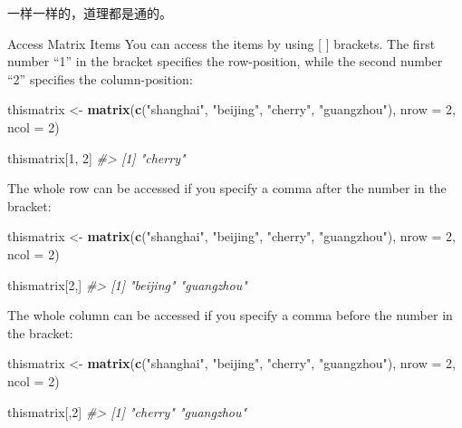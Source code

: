 \documentclass[
]{book}
\newenvironment{Shaded}{\begin{snugshade}}{\end{snugshade}}
\newcommand{\AttributeTok}[1]{\textcolor[rgb]{0.13,0.29,0.53}{#1}}
\newcommand{\CommentTok}[1]{\textcolor[rgb]{0.56,0.35,0.01}{\textit{#1}}}
\newcommand{\DecValTok}[1]{\textcolor[rgb]{0.00,0.00,0.81}{#1}}
\newcommand{\FunctionTok}[1]{\textcolor[rgb]{0.13,0.29,0.53}{\textbf{#1}}}
\newcommand{\NormalTok}[1]{#1}
\newcommand{\OtherTok}[1]{\textcolor[rgb]{0.56,0.35,0.01}{#1}}
\newcommand{\StringTok}[1]{\textcolor[rgb]{0.31,0.60,0.02}{#1}}
\begin{document}
一样一样的，道理都是通的。

Access Matrix Items
You can access the items by using {[} {]} brackets. The first number ``1'' in the bracket specifies the row-position, while the second number ``2'' specifies the column-position:

\begin{Shaded}
\begin{Highlighting}[]
\NormalTok{thismatrix }\OtherTok{\textless{}{-}} \FunctionTok{matrix}\NormalTok{(}\FunctionTok{c}\NormalTok{(}\StringTok{"shanghai"}\NormalTok{, }\StringTok{"beijing"}\NormalTok{, }\StringTok{"cherry"}\NormalTok{, }\StringTok{"guangzhou"}\NormalTok{), }\AttributeTok{nrow =} \DecValTok{2}\NormalTok{, }\AttributeTok{ncol =} \DecValTok{2}\NormalTok{)}

\NormalTok{thismatrix[}\DecValTok{1}\NormalTok{, }\DecValTok{2}\NormalTok{]}
\CommentTok{\#\textgreater{} [1] "cherry"}
\end{Highlighting}
\end{Shaded}

The whole row can be accessed if you specify a comma after the number in the bracket:

\begin{Shaded}
\begin{Highlighting}[]
\NormalTok{thismatrix }\OtherTok{\textless{}{-}} \FunctionTok{matrix}\NormalTok{(}\FunctionTok{c}\NormalTok{(}\StringTok{"shanghai"}\NormalTok{, }\StringTok{"beijing"}\NormalTok{, }\StringTok{"cherry"}\NormalTok{, }\StringTok{"guangzhou"}\NormalTok{), }\AttributeTok{nrow =} \DecValTok{2}\NormalTok{, }\AttributeTok{ncol =} \DecValTok{2}\NormalTok{)}

\NormalTok{thismatrix[}\DecValTok{2}\NormalTok{,]}
\CommentTok{\#\textgreater{} [1] "beijing"   "guangzhou"}
\end{Highlighting}
\end{Shaded}

The whole column can be accessed if you specify a comma before the number in the bracket:

\begin{Shaded}
\begin{Highlighting}[]
\NormalTok{thismatrix }\OtherTok{\textless{}{-}} \FunctionTok{matrix}\NormalTok{(}\FunctionTok{c}\NormalTok{(}\StringTok{"shanghai"}\NormalTok{, }\StringTok{"beijing"}\NormalTok{, }\StringTok{"cherry"}\NormalTok{, }\StringTok{"guangzhou"}\NormalTok{), }\AttributeTok{nrow =} \DecValTok{2}\NormalTok{, }\AttributeTok{ncol =} \DecValTok{2}\NormalTok{)}

\NormalTok{thismatrix[,}\DecValTok{2}\NormalTok{]}
\CommentTok{\#\textgreater{} [1] "cherry"    "guangzhou"}
\end{Highlighting}
\end{Shaded}
\end{document}

